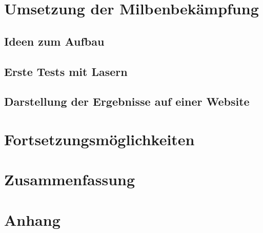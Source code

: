 \documentclass[11pt,a4paper]{article}
\begin{document}
\newpage
\section{Umsetzung der Milbenbekämpfung}
\subsection{Ideen zum Aufbau}

\subsection{Erste Tests mit Lasern}

\subsection{Darstellung der Ergebnisse auf einer Website}



\newpage
\section{Fortsetzungsmöglichkeiten}


\newpage
\section{Zusammenfassung}

\newpage
\section{Anhang}
\end{document}
